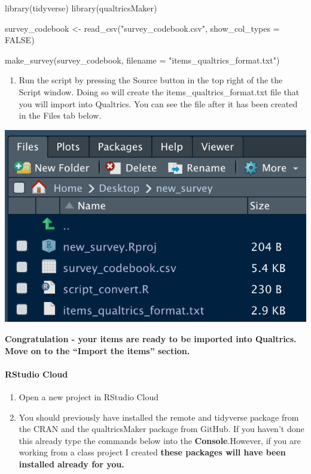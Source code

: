 \documentclass[
]{krantz}
\makeatletter
\newenvironment{Shaded}{\begin{snugshade}}{\end{snugshade}}
\newcommand{\AttributeTok}[1]{\textcolor[rgb]{0.61,0.61,0.61}{#1}}
\newcommand{\ConstantTok}[1]{\textcolor[rgb]{0,0,0}{#1}}
\newcommand{\FunctionTok}[1]{\textcolor[rgb]{0,0,0}{#1}}
\newcommand{\NormalTok}[1]{#1}
\newcommand{\OtherTok}[1]{\textcolor[rgb]{0.37,0.37,0.37}{#1}}
\newcommand{\StringTok}[1]{\textcolor[rgb]{0.5,0.5,0.5}{#1}}
\providecommand{\tightlist}{%
  \setlength{\itemsep}{0pt}\setlength{\parskip}{0pt}}
\newenvironment{kframe}{%
\medskip{}
\setlength{\fboxsep}{.8em}
 \def\at@end@of@kframe{}%
 \ifinner\ifhmode%
  \def\at@end@of@kframe{\end{minipage}}%
  \begin{minipage}{\columnwidth}%
 \fi\fi%
 \def\FrameCommand##1{\hskip\@totalleftmargin \hskip-\fboxsep
 \colorbox{shadecolor}{##1}\hskip-\fboxsep
     \hskip-\linewidth \hskip-\@totalleftmargin \hskip\columnwidth}%
 \MakeFramed {\advance\hsize-\width
   \@totalleftmargin\z@ \linewidth\hsize
   \@setminipage}}%
 {\par\unskip\endMakeFramed%
 \at@end@of@kframe}
\renewenvironment{Shaded}{\begin{kframe}}{\end{kframe}}
\makeatother
\begin{document}
\begin{Shaded}
\begin{Highlighting}[]
\FunctionTok{library}\NormalTok{(tidyverse)}
\FunctionTok{library}\NormalTok{(qualtricsMaker)}

\NormalTok{survey\_codebook }\OtherTok{\textless{}{-}} \FunctionTok{read\_csv}\NormalTok{(}\StringTok{"survey\_codebook.csv"}\NormalTok{,}
                            \AttributeTok{show\_col\_types =} \ConstantTok{FALSE}\NormalTok{)}

\FunctionTok{make\_survey}\NormalTok{(survey\_codebook,}
            \AttributeTok{filename =} \StringTok{"items\_qualtrics\_format.txt"}\NormalTok{)}
\end{Highlighting}
\end{Shaded}

\begin{enumerate}
\def\labelenumi{\arabic{enumi}.}
\setcounter{enumi}{4}
\tightlist
\item
  Run the script by pressing the Source button in the top right of the the Script window. Doing so will create the items\_qualtrics\_format.txt file that you will import into Qualtrics. You can see the file after it has been created in the Files tab below.
\end{enumerate}

\includegraphics[width=0.5\linewidth]{ch_qualtrics/images/screenshot_post_creation}

\textbf{Congratulation - your items are ready to be imported into Qualtrics. Move on to the ``Import the items'' section.}

\hypertarget{rstudio-cloud}{%
\paragraph{RStudio Cloud}\label{rstudio-cloud}}

\begin{enumerate}
\def\labelenumi{\arabic{enumi}.}
\item
  Open a new project in RStudio Cloud
\item
  You should previously have installed the remote and tidyverse package from the CRAN and the qualtricsMaker package from GitHub. If you haven't done this already type the commands below into the \textbf{Console}.However, if you are working from a class project I created \textbf{these packages will have been installed already for you.}
\end{enumerate}
\end{document}
